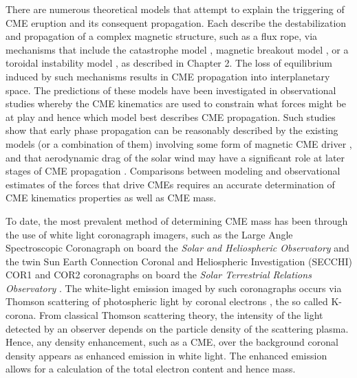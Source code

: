 There are numerous theoretical models that attempt to explain the triggering of CME eruption and its consequent propagation. Each describe the destabilization and propagation of a complex magnetic structure, such as a flux rope, via mechanisms that include the catastrophe model \citep{forbes1991,forbes1995,lin2000}, magnetic breakout model \citep{antio99,lynch2008}, or a toroidal instability model \citep{chen1996,kleim2006}, as described in Chapter 2. The loss of equilibrium induced by such mechanisms results in CME propagation into interplanetary space. The predictions of these models have been investigated in observational studies whereby the CME kinematics are used to constrain what forces might be at play and hence which model best describes CME propagation. Such studies show that early phase propagation can be reasonably described by the existing models (or a combination of them) involving some form of magnetic CME driver \citep{manoh2003, chen2006, schrijver2008c, lin2010}, and that aerodynamic drag of the solar wind may have a significant role at later stages of CME propagation \citep{howard2007, malo10, byrne2010}. Comparisons between modeling and observational estimates of the forces that drive CMEs requires an accurate determination of CME kinematics properties as well as CME mass.

To date, the most prevalent method of determining CME mass has been through the use of white light coronagraph imagers, such as the Large Angle Spectroscopic Coronagraph  \citep[LASCO;][]{bru95} on board the \emph{Solar and Heliospheric Observatory} \citep[\emph{SOHO};][]{dom95}  and the twin Sun Earth Connection Coronal and Heliospheric Investigation (SECCHI) COR1 and COR2 coronagraphs \citep{how08} on board the \emph{Solar Terrestrial Relations Observatory}  \citep[\emph{STEREO};][]{kai08}. The white-light emission imaged by such coronagraphs occurs via Thomson scattering of photospheric light by coronal electrons \citep{min30, vdeh50, bil66}, the so called K-corona.  From classical Thomson scattering theory, the intensity of the light detected by an observer depends on the particle density of the scattering plasma. Hence, any density enhancement, such as a CME, over the background coronal density appears as enhanced emission in white light. The enhanced emission allows for a calculation of the total electron content and hence mass. 

